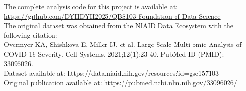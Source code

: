 \documentclass[a4paper,12pt]{article}
\begin{document}
The complete analysis code for this project is available at: \\
\url{https://github.com/DYHDYH2025/QBS103-Foundation-of-Data-Science}\\

\noindent The original dataset was obtained from the NIAID Data Ecosystem with the following citation: \\
Overmyer KA, Shishkova E, Miller IJ, et al. Large-Scale Multi-omic Analysis of COVID-19 Severity. Cell Systems. 2021;12(1):23-40. PubMed ID (PMID): 33096026. \\
Dataset available at: \url{https://data.niaid.nih.gov/resources?id=gse157103} \\
Original publication available at: \url{https://pubmed.ncbi.nlm.nih.gov/33096026/}
\end{document}
